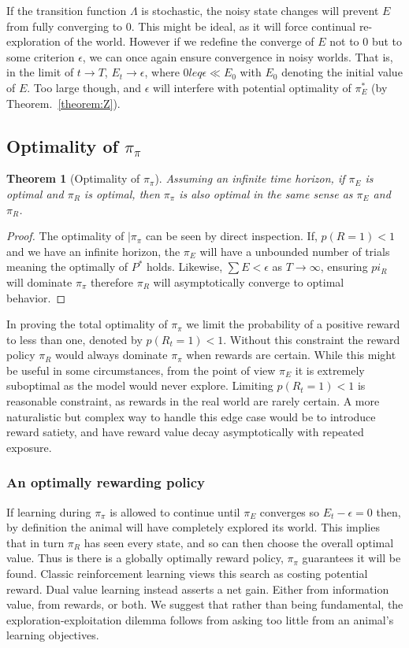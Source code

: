 \documentclass[9pt,twocolumn,twoside]{pnas-new}
\newtheorem{theorem}{Theorem}
\begin{document}
If the transition function $\Lambda$ is stochastic, the noisy state changes will prevent $E$ from fully converging to 0. This might be ideal, as it will force continual re-exploration of the world. However if we redefine the converge of $E$ not to 0 but to some criterion $\epsilon$, we can once again ensure convergence in noisy worlds. That is, in the limit of $t \rightarrow T$, $E_t \rightarrow \epsilon$, where $0 leq \epsilon \ll E_0$ with $E_0$ denoting the initial value of $E$. Too large though, and $\epsilon$ will interfere with potential optimality of $\pi^*_E$ (by Theorem.~\ref{theorem:Z}). 

\subsection*{Optimality of $\pi_{\pi}$}

\begin{theorem}[Optimality of $\pi_{\pi}$] \label{theorem:meta}
    Assuming an infinite time horizon, if $\pi_E$ is optimal and $\pi_R$ is optimal, then $\pi_{\pi}$ is also optimal in the same sense as $\pi_E$ and $\pi_R$.
\end{theorem}
\begin{proof}
    The optimality of $|\pi_{\pi}$ can be seen by direct inspection. If, $p(R = 1) < 1$ and we have an infinite horizon, the $\pi_E$ will have a unbounded number of trials meaning the optimally of $P^*$ holds. Likewise, $\sum E < \epsilon$ as $T \rightarrow \infty$, ensuring $pi_R$ will dominate $\pi_{\pi}$ therefore $\pi_R$ will asymptotically converge to optimal behavior.
\end{proof}

In proving the total optimality of $\pi_{\pi}$ we limit the probability of a positive reward to less than one, denoted by $p(R_t = 1) < 1$. Without this constraint the reward policy $\pi_R$ would always dominate $\pi_{\pi}$ when rewards are certain. While this might be useful in some circumstances, from the point of view $\pi_E$ it is extremely suboptimal as the model would never explore. Limiting $p(R_t = 1) < 1$ is reasonable constraint, as rewards in the real world are rarely certain. A more naturalistic but complex way to handle this edge case would be to introduce reward satiety, and have reward value decay asymptotically with repeated exposure. 


\subsubsection*{An optimally rewarding policy}
If learning during $\pi_{\pi}$ is allowed to continue until $\pi_E$ converges so $E_t - \epsilon = 0$ then, by definition the animal will have completely explored its world. This implies that in turn $\pi_R$ has seen every state, and so can then choose the overall optimal value. Thus is there is a globally optimally reward policy, $\pi_{\pi}$ guarantees it will be found. Classic reinforcement learning views this search as costing potential reward. Dual value learning instead asserts a net gain. Either from information value, from rewards, or both. We suggest that rather than being fundamental, the exploration-exploitation dilemma follows from asking too little from an animal's learning objectives.
\end{document}
